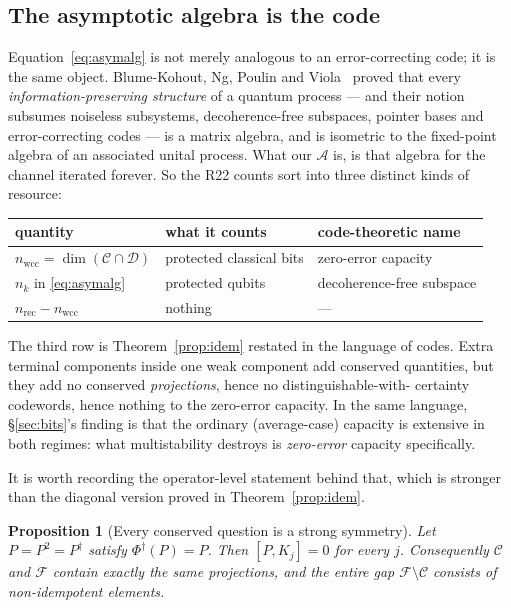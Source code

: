\documentclass[11pt]{article}
\newcommand{\Phid}{\Phi^{\dagger}}
\theoremstyle{plain}
\newtheorem{proposition}{Proposition}
\theoremstyle{definition}
\theoremstyle{remark}
\begin{document}
\subsection{The asymptotic algebra is the code}

Equation~\eqref{eq:asymalg} is not merely analogous to an error-correcting code;
it is the same object. Blume-Kohout, Ng, Poulin and Viola~\cite{bknpv2008}
proved that every \emph{information-preserving structure} of a quantum process
--- and their notion subsumes noiseless subsystems, decoherence-free subspaces,
pointer bases and error-correcting codes --- is a matrix algebra, and is
isometric to the fixed-point algebra of an associated unital process. What our
$\mathcal{A}$ is, is that algebra for the channel iterated forever. So the R22
counts sort into three distinct kinds of resource:

\begin{center}
\begin{tabular}{lll}
\toprule
quantity & what it counts & code-theoretic name \\
\midrule
$n_{\mathrm{wcc}} = \dim(\mathcal{C}\cap\mathcal{D})$ & protected classical bits
  & zero-error capacity \\
$n_k$ in \eqref{eq:asymalg} & protected qubits
  & decoherence-free subspace \\
$n_{\mathrm{rec}} - n_{\mathrm{wcc}}$ & nothing & --- \\
\bottomrule
\end{tabular}
\end{center}

The third row is Theorem~\ref{prop:idem} restated in the language of codes.
Extra terminal components inside one weak component add conserved quantities,
but they add no conserved \emph{projections}, hence no distinguishable-with-
certainty codewords, hence nothing to the zero-error capacity. In the same
language, \S\ref{sec:bits}'s finding is that the ordinary (average-case)
capacity is extensive in both regimes: what multistability destroys is
\emph{zero-error} capacity specifically.

It is worth recording the operator-level statement behind that, which is
stronger than the diagonal version proved in Theorem~\ref{prop:idem}.

\begin{proposition}[Every conserved question is a strong symmetry]
\label{prop:projections}
Let $P = P^2 = P^\dagger$ satisfy $\Phid(P) = P$. Then $[P, K_j] = 0$ for every
$j$. Consequently $\mathcal{C}$ and $\mathcal{F}$ contain exactly the same
projections, and the entire gap $\mathcal{F}\setminus\mathcal{C}$ consists of
non-idempotent elements.
\end{proposition}
\end{document}
